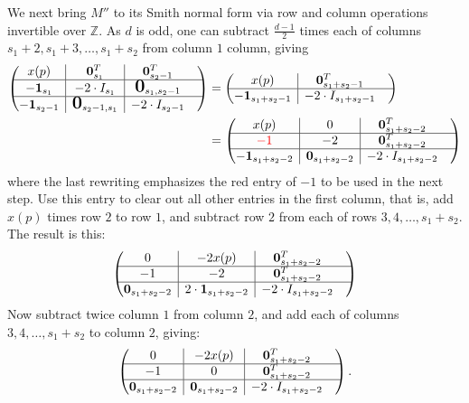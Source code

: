 \documentclass[10pt,reqno]{amsart}
\newcommand{\bigzero}{\mbox{\normalfont\Large\bfseries 0}}
\newcommand{\rvline}{\hspace*{-\arraycolsep}\vline\hspace*{-\arraycolsep}}
\newcommand{\Z}{\mathbb{Z}}
\def\onesvector{\mathbf{1}}
\def\zerovector{\mathbf{0}}
\begin{document}
We next bring $M''$ to its Smith normal form via row and column operations invertible over $\Z$.  As $d$ is odd, one can subtract $\frac{d-1}{2}$ times each of columns $s_1+2,s_1+3,\ldots,s_1+s_2$ from column $1$ column, giving
\begin{align*}
\begin{pmatrix*}
x(p) & \rvline & \zerovector^T_{s_1} & \rvline &  \zerovector^T_{s_2-1}& \\
\hline
-\onesvector_{s_1} & \rvline & -2\cdot I_{s_1} & \rvline & \bigzero_{s_1,s_2-1} & \\
\hline
- \onesvector_{s_2-1} & \rvline & \bigzero_{s_2-1,s_1} & \rvline & -2\cdot I_{s_2-1}& 
\end{pmatrix*}
&=
\begin{pmatrix*}
x(p)  & \rvline &  \zerovector^T_{s_1+s_2-1}& \\
\hline
-\onesvector_{s_1 +s_2-1} &\rvline& -2\cdot I_ {s_1+s_2-1}& \\
\end{pmatrix*}\\
&=
\begin{pmatrix*}
x(p) & \rvline & 0 & \rvline &  \zerovector^T_{s_1+s_2-2}& \\
\hline
{\color{red}-1} & \rvline & -2 & \rvline & \zerovector^T_{s_1+s_2-2} & \\
\hline
-\onesvector_{s_1+s_2-2} & \rvline & \zerovector_{s_1+s_2-2} & \rvline & -2\cdot I_{s_1+s_2-2}& 
\end{pmatrix*}
\end{align*}
where the last rewriting emphasizes the red entry of $-1$ to be used in the next step.
Use this entry to clear out all other entries in the first column, that is, add $x(p)$
times row $2$ to row $1$, and subtract row $2$ from each of rows $3,4,\ldots,s_1+s_2$.  The result is this:
\begin{equation*}
\begin{pmatrix*}

0 & \rvline & -2x(p)  & \rvline &  \zerovector^T_{s_1+s_2-2}& \\
\hline
-1 & \rvline & -2& \rvline & \zerovector^T_{s_1+s_2-2} & \\
\hline
\zerovector_{s_1+s_2-2} & \rvline & 2\cdot \onesvector_{s_1+s_2-2} & \rvline & -2\cdot I_{s_1+s_2-2}& 
\end{pmatrix*}
\end{equation*}
Now subtract twice column $1$ from column $2$,
and add each of columns $3,4,\ldots,s_1+s_2$ to column $2$, giving:
$$
\begin{pmatrix*}
0 & \rvline & -2x(p)  & \rvline &  \zerovector^T_{s_1+s_2-2}& \\
\hline
-1 & \rvline & 0& \rvline & \zerovector^T_{s_1+s_2-2} & \\
\hline
\zerovector_{s_1+s_2-2} & \rvline &  \zerovector_{s_1+s_2-2} & \rvline & -2\cdot I_{s_1+s_2-2}& 
\end{pmatrix*}.
$$
\end{document}
